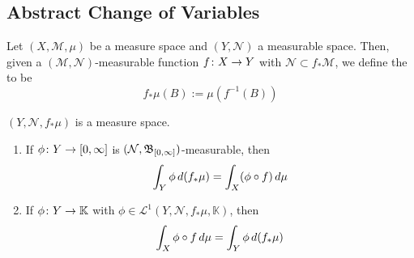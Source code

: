 \documentclass[11pt,leqno,oneside]{amsbook}
\numberwithin{thm}{section}
\newcommand{\M}{\mathcal{M}} %
\newcommand{\cL}{\mathcal{L}}
\newcommand{\cN}{\mathcal{N}}
\newcommand{\K}{\mathbb{K}} %
\begin{document}
\subsection{Abstract Change of Variables}
\begin{defn}
  Let \((X,\M,\mu)\) be a measure space and \((Y,\cN)\) a measurable
  space. Then, given a \((\M,\cN)\)-measurable function \(f \colon X
  \to Y\) with \(\cN \subset f_* \M\), we define the  to be \[
    f_* \mu(B) := \mu(f^{-1}(B))
  \]
\end{defn}
\begin{prop}
  \((Y,\cN,f_*\mu)\) is a measure space.
\end{prop}
\begin{thm} \mbox{}
  \begin{enumerate}
  \item If \(\phi \colon Y \to [0,\infty]\) is
    \((\cN,\B_{[0,\infty]})\)-measurable, then \[
      \int_Y \phi \, d(f_*\mu) = \int_X(\phi \circ f) \, d\mu
    \]
  \item If \(\phi \from Y \to \K\) with \(\phi \in \cL^1(Y,\cN,
    f_*\mu,\K)\), then \[
      \int_X \phi\circ f \, d\mu = \int_Y \phi \, d(f_*\mu)
    \]
  \end{enumerate}
\end{thm}
\end{document}
